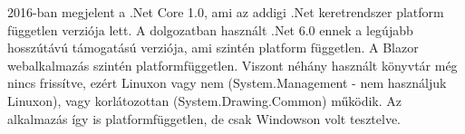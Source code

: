 \newpage
{}
2016-ban megjelent a .Net Core 1.0, ami az addigi .Net keretrendszer platform független verziója lett. A dolgozatban használt .Net 6.0 ennek a legújabb hosszútávú támogatású verziója, ami szintén platform független. A Blazor webalkalmazás szintén platformfüggetlen. Viszont néhány használt könyvtár még nincs  frissítve, ezért Linuxon vagy nem (System.Management - nem használjuk Linuxon), vagy korlátozottan (System.Drawing.Common) működik. Az alkalmazás így is platformfüggetlen, de csak Windowson volt tesztelve.



